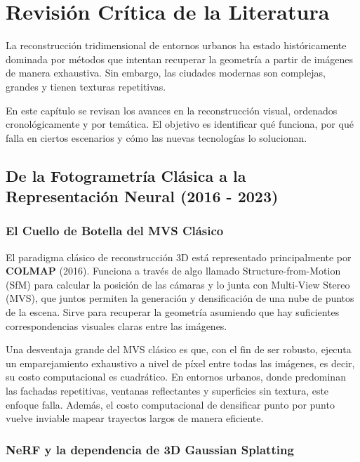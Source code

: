 \chapter{Revisión Crítica de la Literatura}

La reconstrucción tridimensional de entornos urbanos ha estado históricamente dominada por métodos que intentan recuperar la geometría a partir de imágenes de manera exhaustiva. Sin embargo, las ciudades modernas son complejas, grandes y tienen texturas repetitivas. 

En este capítulo se revisan los avances en la reconstrucción visual, ordenados cronológicamente y por temática. El objetivo es identificar qué funciona, por qué falla en ciertos escenarios y cómo las nuevas tecnologías lo solucionan.

\section{De la Fotogrametría Clásica a la Representación Neural (2016 - 2023)}

\subsection{El Cuello de Botella del MVS Clásico}

El paradigma clásico de reconstrucción 3D está representado principalmente por \textbf{COLMAP} \cite{schonberger2016structure} (2016). Funciona a través de algo llamado Structure-from-Motion (SfM) para calcular la posición de las cámaras y lo junta con Multi-View Stereo (MVS), que juntos permiten la generación y densificación de una nube de puntos de la escena. Sirve para recuperar la geometría asumiendo que hay suficientes correspondencias visuales claras entre las imágenes.

Una desventaja grande del MVS clásico es que, con el fin de ser robusto, ejecuta un emparejamiento exhaustivo a nivel de píxel entre todas las imágenes, es decir, su costo computacional es cuadrático. En entornos urbanos, donde predominan las fachadas repetitivas, ventanas reflectantes y superficies sin textura, este enfoque falla. Además, el costo computacional de densificar punto por punto vuelve inviable mapear trayectos largos de manera eficiente.

\subsection{NeRF y la dependencia de 3D Gaussian Splatting}

